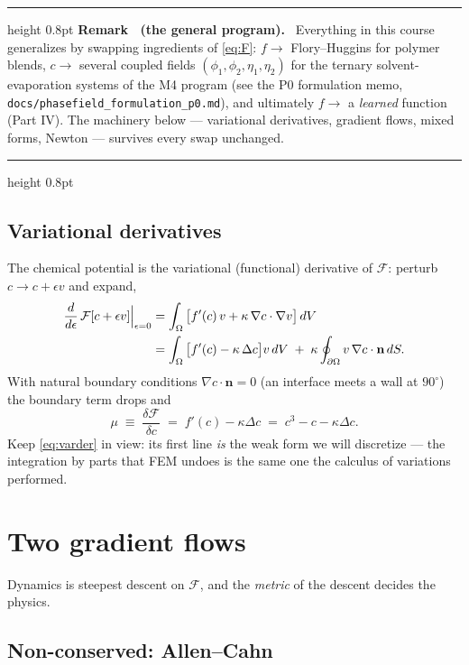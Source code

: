 \documentclass[11pt]{article}
\newcounter{remark}
\newenvironment{remark}[1]{%
  \refstepcounter{remark}\par\medskip
  \noindent\begin{minipage}{\linewidth}
  \hrule height 0.8pt \smallskip
  \textbf{Remark \theremark\ (#1).}\ }{%
  \smallskip\hrule height 0.8pt \end{minipage}\par\medskip}
\newcommand{\vd}[2]{\frac{\delta #1}{\delta #2}}
\begin{document}
\begin{remark}{the general program}
Everything in this course generalizes by swapping ingredients of
\eqref{eq:F}: $f \to$ Flory--Huggins for polymer blends, $c \to$
several coupled fields $(\phi_1,\phi_2,\eta_1,\eta_2)$ for the ternary
solvent-evaporation systems of the M4 program (see the P0 formulation
memo, \texttt{docs/phasefield\_formulation\_p0.md}), and ultimately
$f \to$ a \emph{learned} function (Part IV). The machinery below ---
variational derivatives, gradient flows, mixed forms, Newton ---
survives every swap unchanged.
\end{remark}

\subsection{Variational derivatives}

The chemical potential is the variational (functional) derivative of
$\mathcal{F}$: perturb $c \to c + \epsilon v$ and expand,
\begin{align}
  \frac{d}{d\epsilon}\,\mathcal{F}[c+\epsilon v]\Big|_{\epsilon=0}
  &= \int_\Omega \big[ f'(c)\, v + \kappa\, \nabla c \cdot \nabla v
     \big]\, dV \notag\\
  &= \int_\Omega \big[ f'(c) - \kappa\, \Delta c \big] v \, dV
   \;+\; \kappa \oint_{\partial\Omega} v\, \nabla c\cdot \mathbf{n}\, dS .
  \label{eq:varder}
\end{align}
With natural boundary conditions $\nabla c \cdot \mathbf{n} = 0$ (an
interface meets a wall at $90^\circ$) the boundary term drops and
\begin{equation}
  \mu \;\equiv\; \vd{\mathcal{F}}{c} \;=\; f'(c) - \kappa \Delta c
  \;=\; c^3 - c - \kappa \Delta c .
  \label{eq:mu}
\end{equation}
Keep \eqref{eq:varder} in view: its first line \emph{is} the weak form
we will discretize --- the integration by parts that FEM undoes is the
same one the calculus of variations performed.

\section{Two gradient flows}

Dynamics is steepest descent on $\mathcal{F}$, and the \emph{metric} of
the descent decides the physics.

\subsection{Non-conserved: Allen--Cahn}
\end{document}
